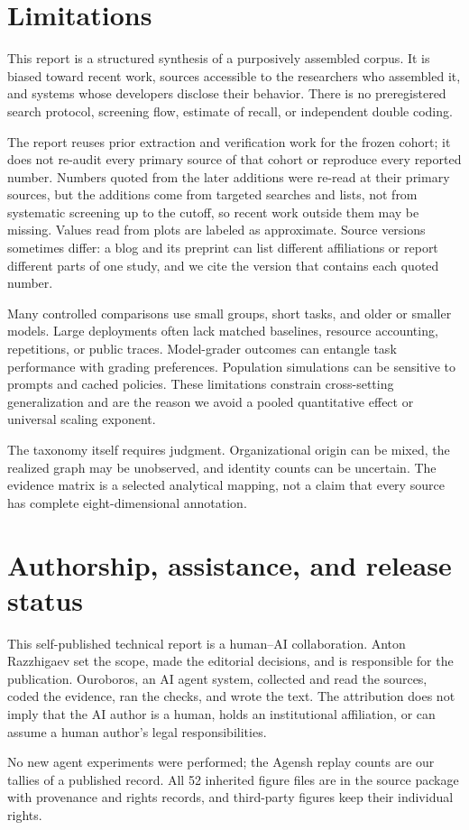 \section*{Limitations}
This report is a structured synthesis of a purposively assembled corpus. It is biased toward recent work, sources accessible to the researchers who assembled it, and systems whose developers disclose their behavior. There is no preregistered search protocol, screening flow, estimate of recall, or independent double coding.

The report reuses prior extraction and verification work for the frozen cohort; it does not re-audit every primary source of that cohort or reproduce every reported number. Numbers quoted from the later additions were re-read at their primary sources, but the additions come from targeted searches and lists, not from systematic screening up to the cutoff, so recent work outside them may be missing. Values read from plots are labeled as approximate. Source versions sometimes differ: a blog and its preprint can list different affiliations or report different parts of one study, and we cite the version that contains each quoted number.

Many controlled comparisons use small groups, short tasks, and older or smaller models. Large deployments often lack matched baselines, resource accounting, repetitions, or public traces. Model-grader outcomes can entangle task performance with grading preferences. Population simulations can be sensitive to prompts and cached policies. These limitations constrain cross-setting generalization and are the reason we avoid a pooled quantitative effect or universal scaling exponent.

The taxonomy itself requires judgment. Organizational origin can be mixed, the realized graph may be unobserved, and identity counts can be uncertain. The evidence matrix is a selected analytical mapping, not a claim that every source has complete eight-dimensional annotation.

\section*{Authorship, assistance, and release status}
This self-published technical report is a human--AI collaboration. Anton Razzhigaev set the scope, made the editorial decisions, and is responsible for the publication. Ouroboros, an AI agent system, collected and read the sources, coded the evidence, ran the checks, and wrote the text. The attribution does not imply that the AI author is a human, holds an institutional affiliation, or can assume a human author's legal responsibilities.

No new agent experiments were performed; the Agensh replay counts are our tallies of a published record. All 52 inherited figure files are in the source package with provenance and rights records, and third-party figures keep their individual rights.
